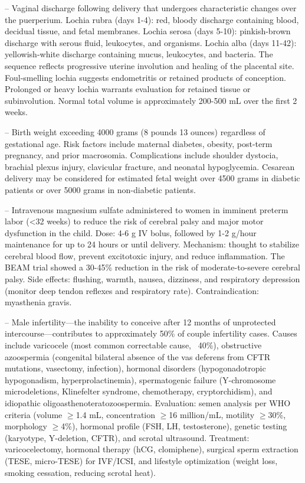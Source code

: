 -- Vaginal discharge following delivery that undergoes characteristic changes over the puerperium. Lochia rubra (days 1-4): red, bloody discharge containing blood, decidual tissue, and fetal membranes. Lochia serosa (days 5-10): pinkish-brown discharge with serous fluid, leukocytes, and organisms. Lochia alba (days 11-42): yellowish-white discharge containing mucus, leukocytes, and bacteria. The sequence reflects progressive uterine involution and healing of the placental site. Foul-smelling lochia suggests endometritis or retained products of conception. Prolonged or heavy lochia warrants evaluation for retained tissue or subinvolution. Normal total volume is approximately 200-500 mL over the first 2 weeks.

-- Birth weight exceeding 4000 grams (8 pounds 13 ounces) regardless of gestational age. Risk factors include maternal diabetes, obesity, post-term pregnancy, and prior macrosomia. Complications include shoulder dystocia, brachial plexus injury, clavicular fracture, and neonatal hypoglycemia. Cesarean delivery may be considered for estimated fetal weight over 4500 grams in diabetic patients or over 5000 grams in non-diabetic patients.

-- Intravenous magnesium sulfate administered to women in imminent preterm labor (<32 weeks) to reduce the risk of cerebral palsy and major motor dysfunction in the child. Dose: 4-6 g IV bolus, followed by 1-2 g/hour maintenance for up to 24 hours or until delivery. Mechanism: thought to stabilize cerebral blood flow, prevent excitotoxic injury, and reduce inflammation. The BEAM trial showed a 30-45\% reduction in the risk of moderate-to-severe cerebral palsy. Side effects: flushing, warmth, nausea, dizziness, and respiratory depression (monitor deep tendon reflexes and respiratory rate). Contraindication: myasthenia gravis.

-- Male infertility—the inability to conceive after 12 months of unprotected intercourse—contributes to approximately 50\% of couple infertility cases. Causes include varicocele (most common correctable cause, ~40\%), obstructive azoospermia (congenital bilateral absence of the vas deferens from CFTR mutations, vasectomy, infection), hormonal disorders (hypogonadotropic hypogonadism, hyperprolactinemia), spermatogenic failure (Y-chromosome microdeletions, Klinefelter syndrome, chemotherapy, cryptorchidism), and idiopathic oligoasthenoteratozoospermia. Evaluation: semen analysis per WHO criteria (volume $\ge$1.4 mL, concentration $\ge$16 million/mL, motility $\ge$30\%, morphology $\ge$4\%), hormonal profile (FSH, LH, testosterone), genetic testing (karyotype, Y-deletion, CFTR), and scrotal ultrasound. Treatment: varicocelectomy, hormonal therapy (hCG, clomiphene), surgical sperm extraction (TESE, micro-TESE) for IVF/ICSI, and lifestyle optimization (weight loss, smoking cessation, reducing scrotal heat).

